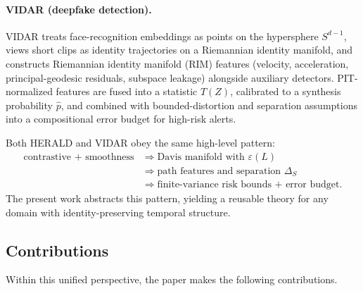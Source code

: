 \documentclass[11pt]{article}
\theoremstyle{remark}
\theoremstyle{plain}
\begin{document}
\paragraph{VIDAR (deepfake detection).}
VIDAR treats face-recognition embeddings as points on the hypersphere $S^{d-1}$, views short clips as identity trajectories on a Riemannian identity manifold, and constructs Riemannian identity manifold (RIM) features (velocity, acceleration, principal-geodesic residuals, subspace leakage) alongside auxiliary detectors. PIT-normalized features are fused into a statistic $T(Z)$, calibrated to a synthesis probability $\hat p$, and combined with bounded-distortion and separation assumptions into a compositional error budget for high-risk alerts.

Both HERALD and VIDAR obey the same high-level pattern:
\begin{align*}
\text{contrastive + smoothness} &\Rightarrow \text{Davis manifold with }\varepsilon(L) \\
&\Rightarrow \text{path features and separation }\Delta_S \\
&\Rightarrow \text{finite-variance risk bounds + error budget}.
\end{align*}
The present work abstracts this pattern, yielding a reusable theory for any domain with identity-preserving temporal structure.

\subsection{Contributions}
\label{sec:contributions}

Within this unified perspective, the paper makes the following contributions.
\end{document}
